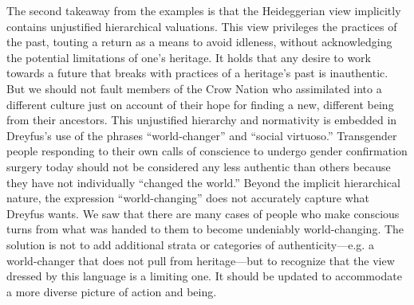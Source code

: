 The second takeaway from the examples is that the Heideggerian view
implicitly contains unjustified hierarchical valuations. This view
privileges the practices of the past, touting a return as a means to
avoid idleness, without acknowledging the potential limitations of one's
heritage. It holds that any desire to work towards a future that breaks
with practices of a heritage's past is inauthentic. But we should not
fault members of the Crow Nation who assimilated into a different
culture just on account of their hope for finding a new, different being
from their ancestors. This unjustified hierarchy and normativity is
embedded in Dreyfus's use of the phrases ``world-changer'' and ``social
virtuoso.'' Transgender people responding to their own calls of
conscience to undergo gender confirmation surgery today should not be
considered any less authentic than others because they have not
individually ``changed the world.'' Beyond the implicit hierarchical
nature, the expression ``world-changing'' does not accurately capture
what Dreyfus wants. We saw that there are many cases of people who make
conscious turns from what was handed to them to become undeniably
world-changing. The solution is not to add additional strata or
categories of authenticity---e.g. a world-changer that does not pull
from heritage---but to recognize that the view dressed by this language
is a limiting one. It should be updated to accommodate a more diverse
picture of action and being.

